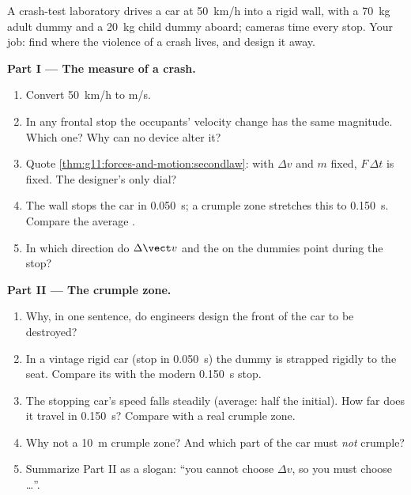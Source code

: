 \begin{problem}
\label{pb:g11:forces-and-motion:1}
A crash-test laboratory drives a car at \qty{50}{km/h} into a rigid
wall, with a \qty{70}{kg} adult dummy and a \qty{20}{kg} child dummy
aboard; cameras time every stop. Your job: find where the violence of a
crash lives, and design it away.

\medskip
\noindent\textbf{Part I --- The measure of a crash.}
\begin{enumerate}
  \item Convert \qty{50}{km/h} to \unit{m/s}.
  \item In any frontal stop the occupants' velocity change has the same
        magnitude. Which one? Why can no device alter it?
  \item Quote \cref{thm:g11:forces-and-motion:secondlaw}: with $\Delta v$
        and $m$ fixed, $F\,\Delta t$ is fixed. The designer's only dial?
  \item The wall stops the car in \qty{0.050}{s}; a crumple zone
        stretches this to \qty{0.150}{s}. Compare the average .
  \item In which direction do $\Delta \vect v$ and the  on
        the dummies point during the stop?
\end{enumerate}

\medskip
\noindent\textbf{Part II --- The crumple zone.}
\begin{enumerate}[resume]
  \item Why, in one sentence, do engineers design the front of the car
        to be destroyed?
  \item In a vintage rigid car (stop in \qty{0.050}{s}) the dummy is strapped
        rigidly to the seat. Compare its  with the modern \qty{0.150}{s} stop.
  \item The stopping car's speed falls steadily (average: half the initial).
        How far does it travel in \qty{0.150}{s}? Compare with a real crumple zone.
  \item Why not a \qty{10}{m} crumple zone? And which part of the car
        must \emph{not} crumple?
  \item Summarize Part II as a slogan: ``you cannot choose $\Delta v$,
        so you must choose \dots''.
\end{enumerate}


\end{problem}
